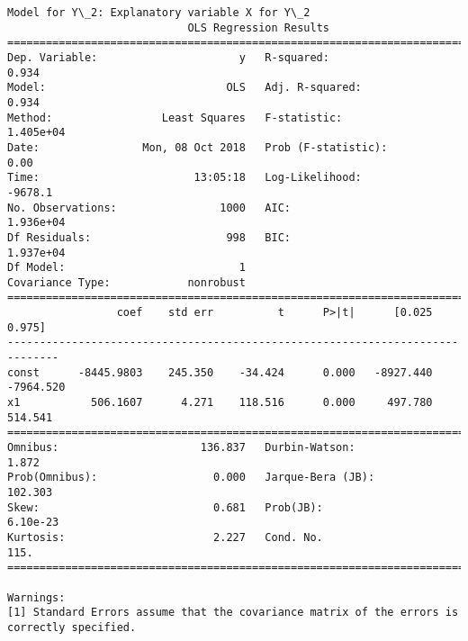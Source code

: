 \documentclass[11pt]{article}
\begin{document}
\begin{Verbatim}[commandchars=\\\{\}]
Model for Y\_2: Explanatory variable X for Y\_2
                            OLS Regression Results                            
==============================================================================
Dep. Variable:                      y   R-squared:                       0.934
Model:                            OLS   Adj. R-squared:                  0.934
Method:                 Least Squares   F-statistic:                 1.405e+04
Date:                Mon, 08 Oct 2018   Prob (F-statistic):               0.00
Time:                        13:05:18   Log-Likelihood:                -9678.1
No. Observations:                1000   AIC:                         1.936e+04
Df Residuals:                     998   BIC:                         1.937e+04
Df Model:                           1                                         
Covariance Type:            nonrobust                                         
==============================================================================
                 coef    std err          t      P>|t|      [0.025      0.975]
------------------------------------------------------------------------------
const      -8445.9803    245.350    -34.424      0.000   -8927.440   -7964.520
x1           506.1607      4.271    118.516      0.000     497.780     514.541
==============================================================================
Omnibus:                      136.837   Durbin-Watson:                   1.872
Prob(Omnibus):                  0.000   Jarque-Bera (JB):              102.303
Skew:                           0.681   Prob(JB):                     6.10e-23
Kurtosis:                       2.227   Cond. No.                         115.
==============================================================================

Warnings:
[1] Standard Errors assume that the covariance matrix of the errors is correctly specified.



\end{Verbatim}
\end{document}

